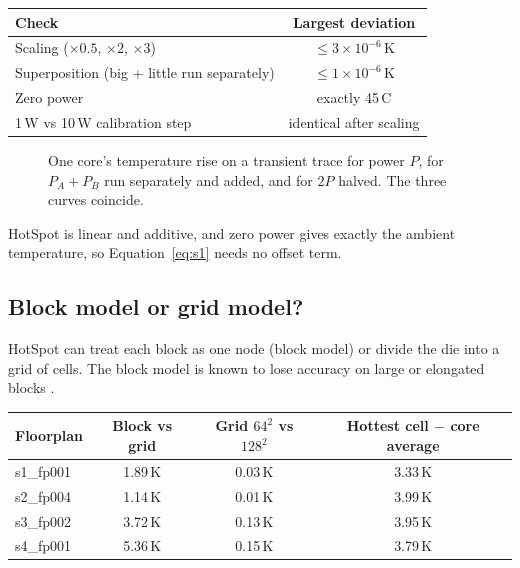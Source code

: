 \documentclass[11pt,a4paper]{article}
\newcommand{\degC}{\,\textdegree C}
\begin{document}
\begin{center}
\small
\begin{tabular}{@{}l c@{}}
\toprule
Check & Largest deviation \\
\midrule
Scaling ($\times 0.5$, $\times 2$, $\times 3$) & $\le 3\times10^{-6}$\,K \\
Superposition (big + little run separately) & $\le 1\times10^{-6}$\,K \\
Zero power & exactly 45\degC \\
1\,W vs 10\,W calibration step & identical after scaling \\
\bottomrule
\end{tabular}
\end{center}

\begin{figure}[H]
  \centering
  \caption{One core's temperature rise on a transient trace for power $P$, for $P_A + P_B$ run
  separately and added, and for $2P$ halved. The three curves coincide.}
\end{figure}

HotSpot is linear and additive, and zero power gives exactly the ambient temperature, so Equation~\eqref{eq:s1} needs no offset term.

\subsection{Block model or grid model?}\label{sec:blockgrid}
HotSpot can treat each block as one node (block model) or divide the die into a grid of cells.
The block model is known to lose accuracy on large or elongated blocks \cite{huang07}.

\begin{center}
\small
\begin{tabular}{@{}l c c c@{}}
\toprule
Floorplan & Block vs grid & Grid $64^2$ vs $128^2$ & Hottest cell $-$ core average \\
\midrule
s1\_fp001 & 1.89\,K & 0.03\,K & 3.33\,K \\
s2\_fp004 & 1.14\,K & 0.01\,K & 3.99\,K \\
s3\_fp002 & 3.72\,K & 0.13\,K & 3.95\,K \\
s4\_fp001 & 5.36\,K & 0.15\,K & 3.79\,K \\
\bottomrule
\end{tabular}
\end{center}
\end{document}
